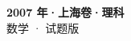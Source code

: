 \documentclass[zihao=-4, a4paper]{ctexart}
\begin{document}
\begin{center}
  {\Large\bfseries 2007 年·上海卷·理科}\\[4pt]
  {\large 数学 · 试题版}
\end{center}
\medskip
{}

\end{document}
